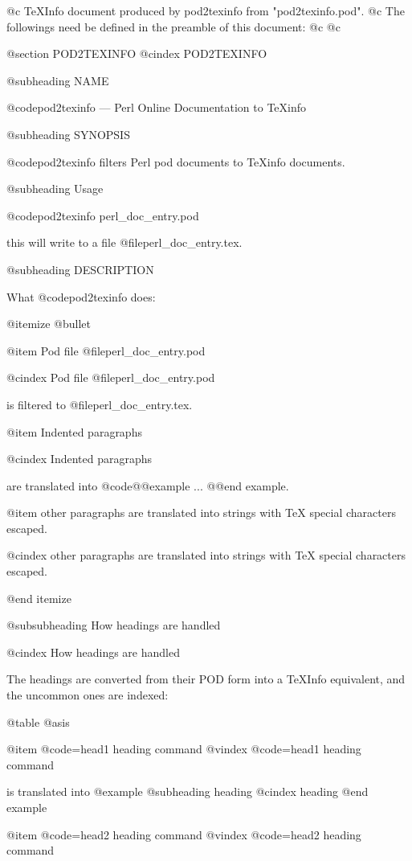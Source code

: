 @c TeXInfo document produced by pod2texinfo from "pod2texinfo.pod".
@c The followings need be defined in the preamble of this document:
@c\def\C++{{\rm C\kern-.05em\raise.3ex\hbox{\footnotesize ++}}}
@c\setlength{\parindent}{0pt}

@section POD2TEXINFO
@cindex POD2TEXINFO

@subheading NAME

@code{pod2texinfo} --- Perl Online Documentation to TeXinfo

@subheading SYNOPSIS

@code{pod2texinfo} filters Perl pod documents to TeXinfo documents.

@subheading Usage

@code{pod2texinfo perl_doc_entry.pod}

this will write to a file @file{perl_doc_entry.tex}.

@subheading DESCRIPTION

What @code{pod2texinfo} does:

@itemize @bullet

@item
Pod file @file{perl_doc_entry.pod}

@cindex Pod file @file{perl_doc_entry.pod}

is filtered to @file{perl_doc_entry.tex}.

@item
Indented paragraphs

@cindex Indented paragraphs

are translated into @code{@@example ... @@end example}.

@item
other paragraphs are translated into strings with TeX special characters escaped.

@cindex other paragraphs are translated into strings with TeX special characters escaped.

@end itemize

@subsubheading How headings are handled

@cindex How headings are handled

The headings are converted from their POD form into a TeXInfo equivalent, and
the uncommon ones are indexed:

@table @asis

@item @code{=head1 heading} command
@vindex @code{=head1 heading} command

is translated into
@example
        @subheading heading
        @cindex heading
@end example

@item @code{=head2 heading} command
@vindex @code{=head2 heading} command

